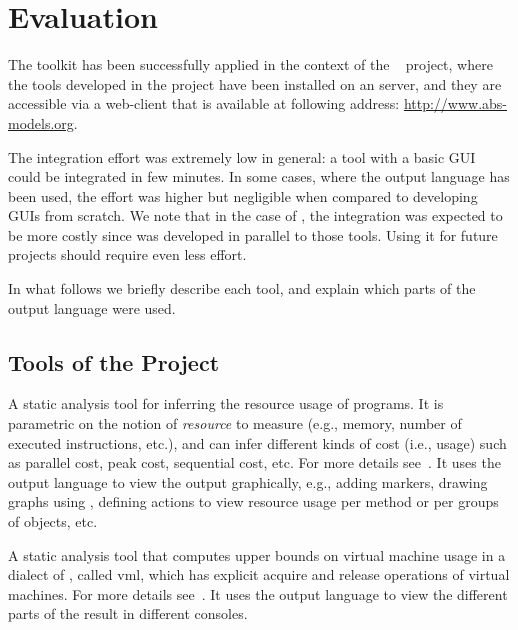 {%
}

\chapter{Evaluation}
\label{ch:evaluation}

The \ei toolkit has been successfully applied in the context of the
\envisage~\cite{envisage} project, where the tools developed in the
project have been installed on an \ei server, and they are accessible
via a web-client that is available at following address:
\url{http://www.abs-models.org}.

The integration effort was extremely low in general: a tool with a
basic GUI could be integrated in few minutes. In some cases, where the
\ei output language has been used, the effort was higher but
negligible when compared to developing GUIs from scratch.
%
We note that in the case of \envisage, the integration was expected to
be more costly since \ei was developed in parallel to those
tools. Using it for future projects should require even less effort.

In what follows we briefly describe each tool, and explain which parts
of the \ei output language were used.

\section{Tools of the \envisage Project}
\label{sec:evaluation:envisage}

%
{%
%
  A static analysis tool for inferring the resource usage of \abs
  programs. It is parametric on the notion of \emph{resource} to
  measure (e.g., memory, number of executed instructions, etc.), and
  can infer different kinds of cost (i.e., usage) such as parallel
  cost, peak cost, sequential cost, etc.
%
}
{%
%
  For more details see~\cite{rasaco,Albert2014}.
%
}
{%
%
  It uses the \ei output language to view the output graphically,
  e.g., adding markers, drawing graphs using , defining
  actions to view resource usage per method or per groups of objects,
  etc.
%
}

{%
%
  A static analysis tool that computes upper bounds on virtual machine
  usage in a dialect of \abs, called \textsf{vml}, which has explicit
  acquire and release operations of virtual machines.
%
}
{%
%
  For more details see~\cite{rasra}.
%
}
{%
%
  It uses the \ei output language to view the different parts of the
  result in different consoles.
%
}

